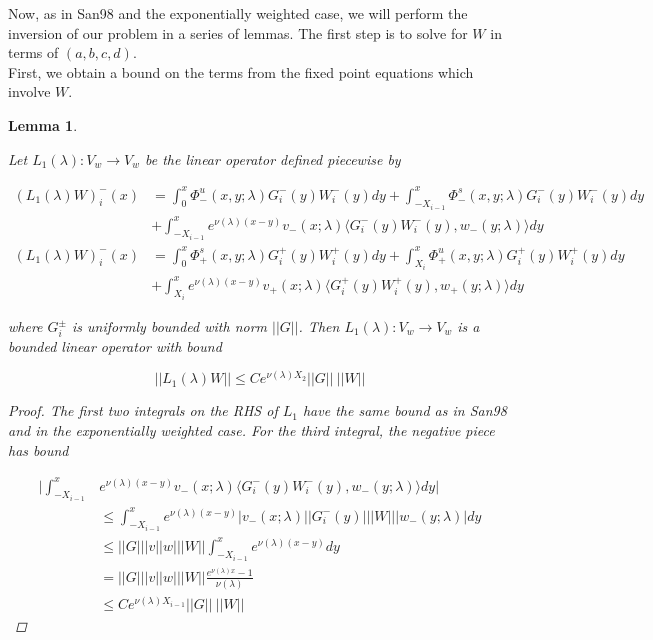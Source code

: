 \documentclass[12pt]{article}
\newtheorem{lemma}{Lemma}
\begin{document}
Now, as in San98 and the exponentially weighted case, we will perform the inversion of our problem in a series of lemmas. The first step is to solve for $W$ in terms of $(a, b, c, d)$.\\

First, we obtain a bound on the terms from the fixed point equations which involve $W$. 


\begin{lemma}\label{L1}

Let $L_1(\lambda): V_w \rightarrow V_w$ be the linear operator defined piecewise by

\begin{align*}
(L_1(\lambda)W)_i^-(x) &= \int_0^x \Phi^u_-(x, y; \lambda) G_i^-(y)W_i^-(y) dy + \int_{-X_{i-1}}^x \Phi^s_-(x, y; \lambda) G_i^-(y)W_i^-(y) dy \\
&+ \int_{-X_{i-1}}^x 
e^{\nu(\lambda)(x-y)} v_-(x; \lambda) \langle G_i^-(y)W_i^-(y), w_-(y; \lambda) \rangle dy \\
(L_1(\lambda)W)_i^-(x) &= \int_0^x \Phi^s_+(x, y; \lambda) G_i^+(y) W_i^+(y) dy + \int_{X_i}^x \Phi^u_+(x, y; \lambda) G_i^+(y) W_i^+(y) dy \\
&+ \int_{X_i}^x e^{\nu(\lambda)(x-y)} v_+(x; \lambda) \langle G_i^+(y)W_i^+(y), w_+(y; \lambda) \rangle dy
\end{align*}

where $G_i^\pm$ is uniformly bounded with norm $||G||$. Then $L_1(\lambda): V_w \rightarrow V_w$ is a bounded linear operator with bound

\begin{equation}\label{L1bound}
||L_1(\lambda)W|| \leq C e^{\nu(\lambda)X_2} ||G|| \: ||W||
\end{equation}

\begin{proof}
The first two integrals on the RHS of $L_1$ have the same bound as in San98 and in the exponentially weighted case. For the third integral, the negative piece has bound

\begin{align*}
\Big| \int_{-X_{i-1}}^x &e^{\nu(\lambda)(x-y)} v_-(x; \lambda) \langle G_i^-(y)W_i^-(y), w_-(y; \lambda) \rangle dy \Big| \\
&\leq \int_{-X_{i-1}}^x e^{\nu(\lambda)(x-y)} |v_-(x; \lambda)| |G_i^-(y)|||W|||w_-(y; \lambda)|dy \\
&\leq ||G|||v||w|||W|| \int_{-X_{i-1}}^x e^{\nu(\lambda)(x-y)} dy \\
&= ||G|||v||w|||W|| \frac{e^{\nu(\lambda)x} - 1}{\nu(\lambda)} \\
&\leq C e^{\nu(\lambda)X_{i-1}} ||G|| \: ||W||
\end{align*}


\end{proof}
\end{lemma}
\end{document}
